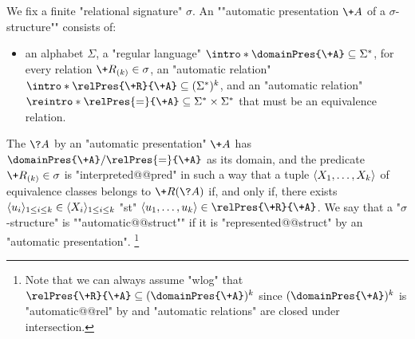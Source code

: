 We fix a finite "relational signature" $\sigma$.
An \AP""automatic presentation $\+A$ of a $\sigma$-structure"" consists of:
\begin{itemize}
	\item an alphabet $\Sigma$,
	\itemAP a "regular language" $\intro*\domainPres{\+A} \subseteq \Sigma^*$,
	\itemAP for every relation $\+R_{(k)} \in \sigma$, an
		"automatic relation" $\intro*\relPres{\+R}{\+A} \subseteq (\Sigma^*)^k$, and
	\itemAP an "automatic relation" $\reintro*\relPres{=}{\+A} \subseteq
		\Sigma^* \times \Sigma^*$ that must be an equivalence relation. 
\end{itemize} 
The \AP{} $\?A$ by an "automatic presentation" $\+A$ has
$\domainPres{\+A}/{\relPres{=}{\+A}}$ as its domain, and the predicate $\+R_{(k)} \in \sigma$
is "interpreted@@pred" in such a way that a tuple $\langle X_1,\dotsc,X_k\rangle$ of equivalence classes
belongs to $\+R(\?A)$ if, and only if, there exists $\langle u_i\rangle_{1 \leq i \leq k} \in\langle X_i\rangle_{1 \leq i \leq k}$ "st" $\tup{u_1,\dotsc,u_k} \in \relPres{\+R}{\+A}$.
We say that a "$\sigma$-structure" is ""automatic@@struct"" if it is
"represented@@struct" by an "automatic presentation".%
\footnote{Note that we can always assume "wlog" that $\relPres{\+R}{\+A} \subseteq
(\domainPres{\+A})^k$ since $(\domainPres{\+A})^k$ is "automatic@@rel" by
 and "automatic relations" are closed under intersection.}

